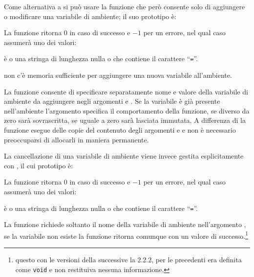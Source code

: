 Come alternativa a  si può usare la funzione  che
però consente solo di aggiungere o modificare una variabile di ambiente; il
suo prototipo è:

\begin{funcproto}{ 
}
{La funzione ritorna $0$ in caso di successo e $-1$ per un errore,
  nel qual caso  assumerà uno dei valori:
  \begin{errlist}
  \item[\errcode{EINVAL}]  è  o una stringa di lunghezza
  nulla o che contiene il carattere ``\texttt{=}''.
  \item[\errcode{ENOMEM}] non c'è memoria sufficiente per aggiungere una nuova
    variabile all'ambiente.
\end{errlist}}
\end{funcproto}

La funzione consente di specificare separatamente nome e valore della
variabile di ambiente da aggiungere negli argomenti 
e . Se la variabile è già presente nell'ambiente
l'argomento  specifica il comportamento della funzione, se
diverso da zero sarà sovrascritta, se uguale a zero sarà lasciata immutata.  A
differenza di  la funzione esegue delle copie del contenuto degli
argomenti  e  e non è necessario preoccuparsi di
allocarli in maniera permanente.

La cancellazione di una variabile di ambiente viene invece gestita
esplicitamente con , il cui prototipo è:

\begin{funcproto}{ 
}
{La funzione ritorna $0$ in caso di successo e $-1$ per un errore,
  nel qual caso  assumerà uno dei valori:
  \begin{errlist}
  \item[\errcode{EINVAL}]  è  o una stringa di lunghezza
  nulla o che contiene il carattere ``\texttt{=}''.
\end{errlist}}
\end{funcproto}

La funzione richiede soltanto il nome della variabile di ambiente
nell'argomento , se la variabile non esiste la funzione ritorna
comunque con un valore di successo.\footnote{questo con le versioni della
   successive la 2.2.2, per le precedenti  era
  definita come \texttt{void} e non restituiva nessuna informazione.}

